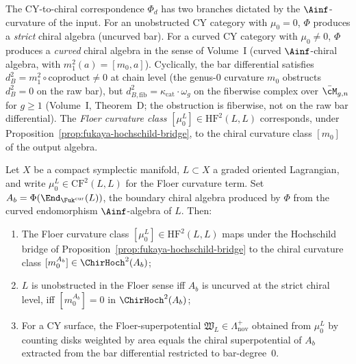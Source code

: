 \begin{remark}
\label{rem:curved-phi-branch}
The CY-to-chiral correspondence $\Phi_d$ has two branches dictated by the
$\Ainf$-curvature of the input. For an unobstructed CY category
with $\mu_0 = 0$, $\Phi$ produces a \emph{strict} chiral algebra
(uncurved bar). For a curved CY category with $\mu_0 \neq 0$,
$\Phi$ produces a \emph{curved} chiral algebra in the sense of
Volume~I (curved $\Ainf$-chiral algebra, with $m_1^2(a) = [m_0,a]$).
Cyclically, the bar differential satisfies
$d_B^2 = m_1^2 \circ \mathrm{coproduct} \neq 0$ at chain level
(the genus-$0$ curvature $m_0$ obstructs $d_B^2 = 0$ on the raw bar),
but $d_{B,\mathrm{fib}}^2 = \kappa_{\mathrm{cat}} \cdot \omega_g$
on the fiberwise complex over $\bar{\cM}_{g,n}$ for $g \geq 1$ (Volume~I,
Theorem~D; the obstruction is fiberwise, not on the raw bar differential). The \emph{Floer curvature class}
$[\mu_0^L] \in \mathrm{HF}^2(L,L)$ corresponds, under
Proposition~\ref{prop:fukaya-hochschild-bridge}, to the
chiral curvature class $[m_0]$ of the output algebra.
\end{remark}

\begin{proposition}
\label{prop:floer-chiral-curvature}
Let $X$ be a compact symplectic manifold, $L \subset X$ a graded
oriented Lagrangian, and write
$\mu_0^L \in \mathrm{CF}^2(L,L)$ for the Floer curvature term.
Set $A_b = \Phi(\End_{\Fuk^{\mathrm{cur}}}(L))$, the boundary
chiral algebra produced by $\Phi$ from the curved endomorphism
$\Ainf$-algebra of $L$. Then:
\begin{enumerate}[label=(\roman*)]
 \item The Floer curvature class $[\mu_0^L] \in \mathrm{HF}^2(L,L)$
 maps under the Hochschild bridge of
 Proposition~\ref{prop:fukaya-hochschild-bridge} to the chiral
 curvature class $[m_0^{A_b}] \in \ChirHoch^2(A_b)$;
 \item $L$ is unobstructed in the Floer sense iff $A_b$ is
 uncurved at the strict chiral level, iff
 $[m_0^{A_b}] = 0$ in $\ChirHoch^2(A_b)$;
 \item For a CY surface, the Floer-superpotential
 $\mathfrak{W}_L \in \Lambda_{\mathrm{nov}}^+$ obtained from
 $\mu_0^L$ by counting disks weighted by area equals the
 chiral superpotential of $A_b$ extracted from the bar
 differential restricted to bar-degree~$0$.
\end{enumerate}
\end{proposition}


